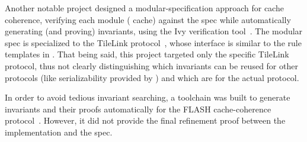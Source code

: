 Another notable project designed a modular-specification approach for cache coherence, verifying each module (\ie{} cache) against the spec while automatically generating (and proving) invariants, using the Ivy verification tool~\cite{ivy:Padon:2016, McMillan:2016, ivy:McMillan:2020}.
The modular spec is specialized to the TileLink protocol~\cite{tilelink}, whose interface is similar to the rule templates in \hemiola{}.
That being said, this project targeted only the specific TileLink protocol, thus not clearly distinguishing which invariants can be reused for other protocols (like serializability provided by \hemiola{}) and which are for the actual protocol.

In order to avoid tedious invariant searching, a toolchain was built to generate invariants and their proofs automatically for the FLASH cache-coherence protocol~\cite{Li:2018}.
However, it did not provide the final refinement proof between the implementation and the spec.


